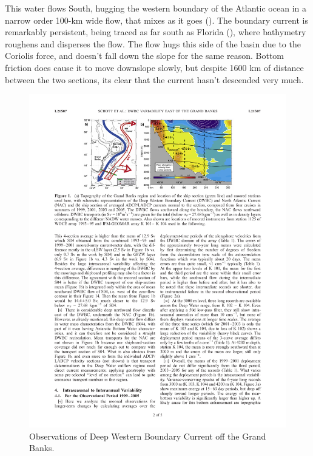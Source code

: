 This water flows South, hugging the western boundary of the Atlantic ocean in a narrow order 100-km wide flow, that mixes as it goes ().  The boundary current is remarkably persistent, being traced as far south as Florida (), where bathymetry roughens and disperses the flow.  The flow hugs this side of the basin due to the Coriolis force, and doesn't fall down the slope for the same reason.  Bottom friction does cause it to move downslope slowly, but despite 1600 km of distance between the two sections, its clear that the current hasn't descended very much.  
\begin{figure}[hbt]
  \begin{center}
    \includegraphics{figs/WaterMasses/DenglerEtAl06Fig1}
    \caption{Observations of Deep Western Boundary Current off the Grand Banks.\citep{schottetal06}}
    \label{fig:DenglerEtAl06Fig1}  
  \end{center}
\end{figure}

